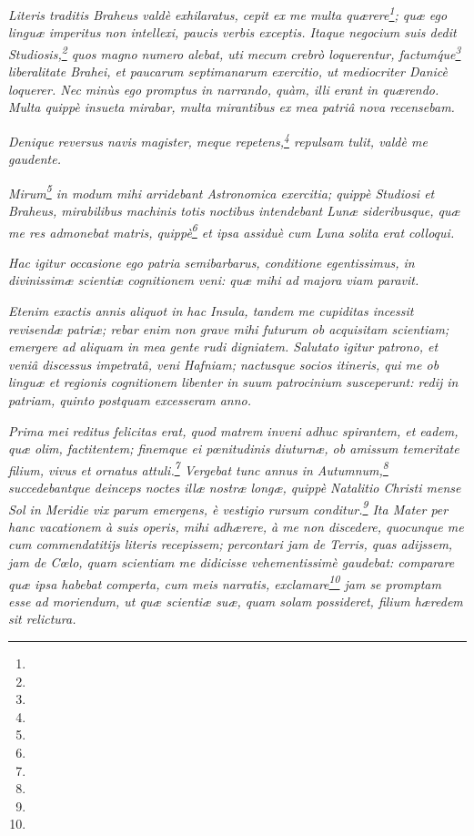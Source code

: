 \documentclass[a4paper, 11pt, oneside, polutonikogreek, german]{article}
\begin{document}
\emph{Literis traditis Braheus valdè exhilaratus, cepit ex me multa quærere\footnote{}; quæ ego linguæ imperitus non intellexi, paucis verbis exceptis. Itaque negocium suis dedit Studiosis,\footnote{} quos magno numero alebat, uti mecum crebrò loquerentur, factum\'que\footnote{} liberalitate Brahei, et paucarum septimanarum exercitio, ut mediocriter Danicè loquerer. Nec minùs ego promptus in narrando, quàm, illi erant in quærendo. Multa quippè insueta mirabar, multa mirantibus ex mea patriâ nova recensebam.}

\emph{Denique reversus navis magister, meque repetens,\footnote{} repulsam tulit, valdè me gaudente.}

\emph{Mirum\footnote{} in modum mihi arridebant Astronomica exercitia; quippè Studiosi et Braheus, mirabilibus machinis totis noctibus intendebant Lunæ sideribusque, quæ me res admonebat matris, quippè\footnote{} et ipsa assiduè cum Luna solita erat colloqui.}

\emph{Hac igitur occasione ego patria semibarbarus, conditione egentissimus, in divinissimæ scientiæ cognitionem veni: quæ mihi ad majora viam paravit.}

\emph{Etenim exactis annis aliquot in hac Insula, tandem me cupiditas incessit revisendæ patriæ; rebar enim non grave mihi futurum ob acquisitam scientiam; emergere ad aliquam in mea gente rudi digniatem. Salutato igitur patrono, et veniâ discessus impetratâ, veni Hafniam; nactusque socios itineris, qui me ob linguæ et regionis cognitionem libenter in suum patrocinium susceperunt: redij in patriam, quinto postquam excesseram anno.}

\emph{Prima mei reditus felicitas erat, quod matrem inveni adhuc spirantem, et eadem, quæ olim, factitentem; finemque ei pœnitudinis diuturnæ, ob amissum temeritate filium, vivus et ornatus attuli.\footnote{} Vergebat tunc annus in Autumnum,\footnote{} succedebantque deinceps noctes illæ nostræ longæ, quippè Natalitio Christi mense Sol in Meridie vix parum emergens, è vestigio rursum conditur.\footnote{} Ita Mater per hanc vacationem à suis operis, mihi adhærere, à me non discedere, quocunque me cum commendatitijs literis recepissem; percontari jam de Terris, quas adijssem, jam de Cœlo, quam scientiam me didicisse vehementissimè gaudebat: comparare quæ ipsa habebat comperta, cum meis narratis, exclamare\footnote{} jam se promptam esse ad moriendum, ut quæ scientiæ suæ, quam solam possideret, filium hæredem sit relictura.}
\end{document}
